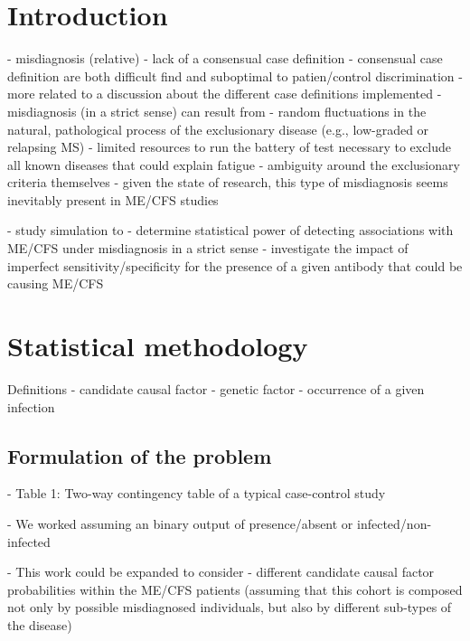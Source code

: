 \section{Introduction}

- misdiagnosis (relative)
    - lack of a consensual case definition \citep{malato2021Statisticalchallenges}
    - consensual case definition are both difficult find and suboptimal to patien/control discrimination \citep{jason2014ExaminingCase}
    - more related to a discussion about the different case definitions implemented \citep{brurberg2014CaseDefinitions, lim2020ReviewCase}
- misdiagnosis (in a strict sense) can result from
    - random fluctuations in the natural, pathological process of the exclusionary disease (e.g., low-graded or relapsing MS)
    - limited resources to run the battery of test necessary to exclude all known diseases that could explain fatigue
    - ambiguity around the exclusionary criteria themselves \citep{jason2023EstablishingConsensus}
    - given the state of research, this type of misdiagnosis seems inevitably present in ME/CFS studies \citep{nacul2019HowHave}
    
- study simulation to
    - determine statistical power of detecting associations with ME/CFS under misdiagnosis in a strict sense
    - investigate the impact of imperfect sensitivity/specificity for the presence of a given antibody that could be causing ME/CFS

\section{Statistical methodology}

Definitions
    - candidate causal factor
        - genetic factor
        - occurrence of a given infection


\subsection{Formulation of the problem}

- Table 1: Two-way contingency table of a typical case-control study

- We worked assuming an binary output of presence/absent or infected/non-infected

- This work could be expanded to consider
    - different candidate causal factor probabilities within the ME/CFS patients (assuming that this cohort is composed not only by possible misdiagnosed individuals, but also by different sub-types of the disease)

